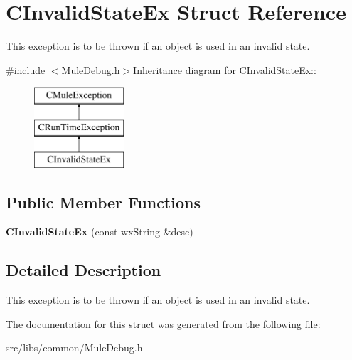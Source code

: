 \section{CInvalidStateEx Struct Reference}
\label{structCInvalidStateEx}


This exception is to be thrown if an object is used in an invalid state.  


{\ttfamily \#include $<$MuleDebug.h$>$}Inheritance diagram for CInvalidStateEx::\begin{figure}[H]
\begin{center}
\leavevmode
\includegraphics[height=3cm]{structCInvalidStateEx}
\end{center}
\end{figure}
\subsection*{Public Member Functions}
\begin{DoxyCompactItemize}
\item 
{\bfseries CInvalidStateEx} (const wxString \&desc)\label{structCInvalidStateEx_acd33bc26aa27ed7edc0062ee5e1c8c8e}

\end{DoxyCompactItemize}


\subsection{Detailed Description}
This exception is to be thrown if an object is used in an invalid state. 

The documentation for this struct was generated from the following file:\begin{DoxyCompactItemize}
\item 
src/libs/common/MuleDebug.h\end{DoxyCompactItemize}
